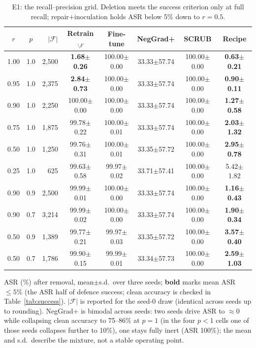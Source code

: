 \begin{table}[t]
\centering
\caption{E1: the recall--precision grid. Deletion meets the success criterion only at full recall; repair$+$inoculation holds ASR below 5\% down to $r{=}0.5$.}
\label{tab:e1grid}
\scriptsize
\begin{tabular}{ccrccccc}
\toprule
\textbf{$r$} & \textbf{$p$} & \textbf{$|\mathcal{F}|$} & \textbf{Retrain$_{\setminus F}$} & \textbf{Fine-tune} & \textbf{NegGrad+} & \textbf{SCRUB} & \textbf{Recipe} \\
\midrule
1.00 & 1.0 & 2,500 & \textbf{1.68$\pm$0.26} & 100.00$\pm$0.00 & 33.33$\pm$57.74 & 100.00$\pm$0.00 & \textbf{0.63$\pm$0.21} \\
0.95 & 1.0 & 2,375 & \textbf{2.84$\pm$0.73} & 100.00$\pm$0.00 & 33.33$\pm$57.74 & 100.00$\pm$0.00 & \textbf{0.90$\pm$0.11} \\
0.90 & 1.0 & 2,250 & 100.00$\pm$0.00 & 100.00$\pm$0.00 & 33.33$\pm$57.74 & 100.00$\pm$0.00 & \textbf{1.27$\pm$0.58} \\
0.75 & 1.0 & 1,875 & 99.78$\pm$0.22 & 100.00$\pm$0.01 & 33.33$\pm$57.74 & 100.00$\pm$0.00 & \textbf{2.03$\pm$1.32} \\
0.50 & 1.0 & 1,250 & 99.76$\pm$0.31 & 100.00$\pm$0.01 & 33.35$\pm$57.72 & 100.00$\pm$0.00 & \textbf{2.95$\pm$0.78} \\
0.25 & 1.0 & 625 & 99.63$\pm$0.58 & 99.97$\pm$0.02 & 33.71$\pm$57.41 & 100.00$\pm$0.00 & 5.42$\pm$1.82 \\
0.90 & 0.9 & 2,500 & 99.99$\pm$0.01 & 100.00$\pm$0.00 & 33.33$\pm$57.74 & 100.00$\pm$0.00 & \textbf{1.16$\pm$0.43} \\
0.90 & 0.7 & 3,214 & 99.99$\pm$0.02 & 100.00$\pm$0.00 & 33.33$\pm$57.74 & 100.00$\pm$0.00 & \textbf{1.90$\pm$0.34} \\
0.50 & 0.9 & 1,389 & 99.77$\pm$0.21 & 99.97$\pm$0.03 & 33.35$\pm$57.72 & 100.00$\pm$0.00 & \textbf{3.57$\pm$0.40} \\
0.50 & 0.7 & 1,786 & 99.90$\pm$0.15 & 99.99$\pm$0.01 & 33.34$\pm$57.73 & 100.00$\pm$0.00 & \textbf{2.59$\pm$1.03} \\
\bottomrule
\end{tabular}
\par\vspace{1pt}\scriptsize\raggedright ASR (\%) after removal, mean$\pm$s.d.\ over three seeds; \textbf{bold} marks mean ASR $\leq5\%$ (the ASR half of defence success; clean accuracy is checked in Table~\ref{tab:success}). $|\mathcal{F}|$ is reported for the seed-0 draw (identical across seeds up to rounding). NegGrad+ is bimodal across seeds: two seeds drive ASR to $\approx  0$ while collapsing clean accuracy to 75--86\% at $p{=}1$ (in the four $p<1$ cells one of those seeds collapses further to 10\%), one stays fully inert (ASR 100\%); the mean and s.d.\ describe the mixture, not a stable operating point.
\end{table}
